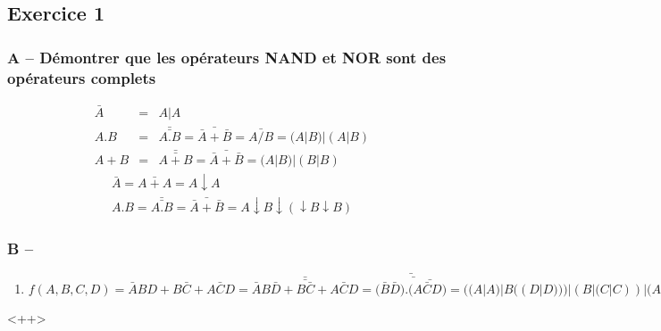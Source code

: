 \documentclass[12pt,a4paper,openany]{book}
\begin{document}
	\subsection{Exercice 1}
		\subsubsection{A -- Démontrer que les opérateurs NAND et NOR sont des opérateurs complets}
		\begin{eqnarray*}
			\bar A &=& A|A\\
			A.B &=& \bar{\bar{A.B}} = \bar{\bar A + \bar B} = \bar{A/B} = (A | B) | (A | B)\\
			A+B &=& \bar{\bar{A+B}} = \bar{\bar A + \bar B} = (A|B) |(B |B)
		\end{eqnarray*}
		\begin{eqnarray*}
			\bar A = \bar{A+A} = A \downarrow A\\
			A . B = \bar{\bar{A.B}} = \bar{\bar A+ \bar B} = A \downarrow B \downarrow (\downarrow B \downarrow B)
		\end{eqnarray*}
		\subsubsection{B --}
		\begin{enumerate}
			\item $f(A,B,C,D)=\bar A B D + B\bar C + A\bar C D= \bar{\bar{\bar A B \bar D + B \bar C + A \bar C D}} 
				= \bar{(\bar{\bar B\bar D).(\bar{A\bar C D)}}} = ( (A|A)|B( (D|D))) | (B|(C|C)) | (A|(C|C)|D)
				$

			
		\end{enumerate}<++>
\end{document}
